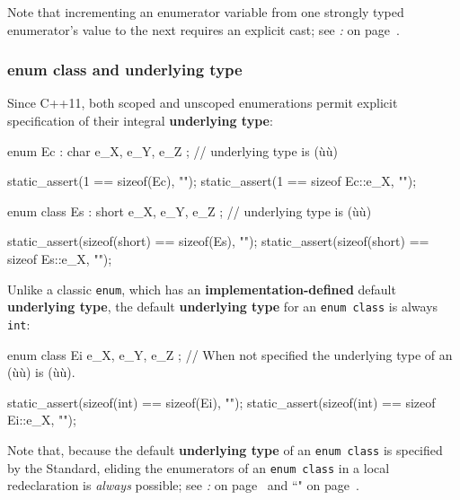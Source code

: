 \noindent Note that incrementing an enumerator variable from one strongly typed
enumerator's value to the next requires an explicit cast; see \textit{: } on page~\pageref{strong-typing-of-an-enum-class-can-be-counterproductive}.

\subsubsection[{\tt enum} {\tt class} and underlying type]{{\SubsubsecCode enum} {\SubsubsecCode class} and underlying type}\label{enum-class-and-underlying-type}

Since C++11, both scoped and unscoped enumerations permit explicit
specification of their integral \textbf{underlying type}:

\begin{emcppslisting}
enum Ec : char { e_X, e_Y, e_Z };
    // underlying type is (ù{}ù)

static_assert(1 == sizeof(Ec),     "");
static_assert(1 == sizeof Ec::e_X, "");

enum class Es : short { e_X, e_Y, e_Z };
    // underlying type is (ù{}ù)

static_assert(sizeof(short) == sizeof(Es),     "");
static_assert(sizeof(short) == sizeof Es::e_X, "");
\end{emcppslisting}

\noindent Unlike a classic \texttt{enum}, which has an
\textbf{implementation-defined} default \textbf{underlying type}, the
default \textbf{underlying type} for an \texttt{enum}~\texttt{class} is
always \texttt{int}:

\begin{emcppslisting}
enum class Ei { e_X, e_Y, e_Z };
    // When not specified the underlying type of an (ù{}ù) is (ù{}ù).

static_assert(sizeof(int) == sizeof(Ei),     "");
static_assert(sizeof(int) == sizeof Ei::e_X, "");
\end{emcppslisting}

\noindent Note that, because the default \textbf{underlying type} of an
\texttt{enum}~\texttt{class} is specified by the Standard, eliding the
enumerators of an \texttt{enum}~\texttt{class} in
a local redeclaration is \emph{always} possible; see
\textit{: } on page~\pageref{external-use-of-opaque-enumerators-enumclass} and ``" on page~\pageref{enumopaque}.

